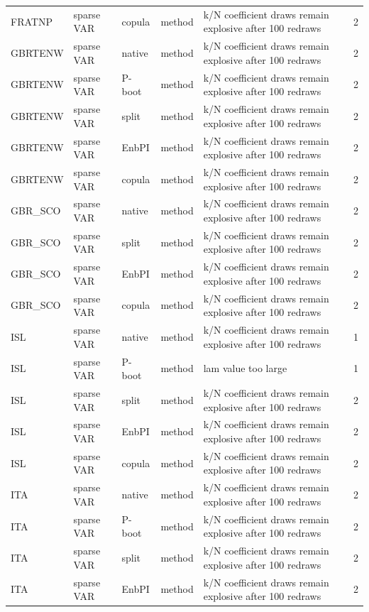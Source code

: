 {\begin{longtable}{@{}lllp{1.6cm}p{6.2cm}r@{}}
FRATNP & sparse VAR & copula & method & k/N coefficient draws remain explosive after 100 redraws & 2 \\
GBRTENW & sparse VAR & native & method & k/N coefficient draws remain explosive after 100 redraws & 2 \\
GBRTENW & sparse VAR & P-boot & method & k/N coefficient draws remain explosive after 100 redraws & 2 \\
GBRTENW & sparse VAR & split & method & k/N coefficient draws remain explosive after 100 redraws & 2 \\
GBRTENW & sparse VAR & EnbPI & method & k/N coefficient draws remain explosive after 100 redraws & 2 \\
GBRTENW & sparse VAR & copula & method & k/N coefficient draws remain explosive after 100 redraws & 2 \\
GBR\_SCO & sparse VAR & native & method & k/N coefficient draws remain explosive after 100 redraws & 2 \\
GBR\_SCO & sparse VAR & split & method & k/N coefficient draws remain explosive after 100 redraws & 2 \\
GBR\_SCO & sparse VAR & EnbPI & method & k/N coefficient draws remain explosive after 100 redraws & 2 \\
GBR\_SCO & sparse VAR & copula & method & k/N coefficient draws remain explosive after 100 redraws & 2 \\
ISL & sparse VAR & native & method & k/N coefficient draws remain explosive after 100 redraws & 1 \\
ISL & sparse VAR & P-boot & method & lam value too large & 1 \\
ISL & sparse VAR & split & method & k/N coefficient draws remain explosive after 100 redraws & 2 \\
ISL & sparse VAR & EnbPI & method & k/N coefficient draws remain explosive after 100 redraws & 2 \\
ISL & sparse VAR & copula & method & k/N coefficient draws remain explosive after 100 redraws & 2 \\
ITA & sparse VAR & native & method & k/N coefficient draws remain explosive after 100 redraws & 2 \\
ITA & sparse VAR & P-boot & method & k/N coefficient draws remain explosive after 100 redraws & 2 \\
ITA & sparse VAR & split & method & k/N coefficient draws remain explosive after 100 redraws & 2 \\
ITA & sparse VAR & EnbPI & method & k/N coefficient draws remain explosive after 100 redraws & 2 \\

\end{longtable}}
